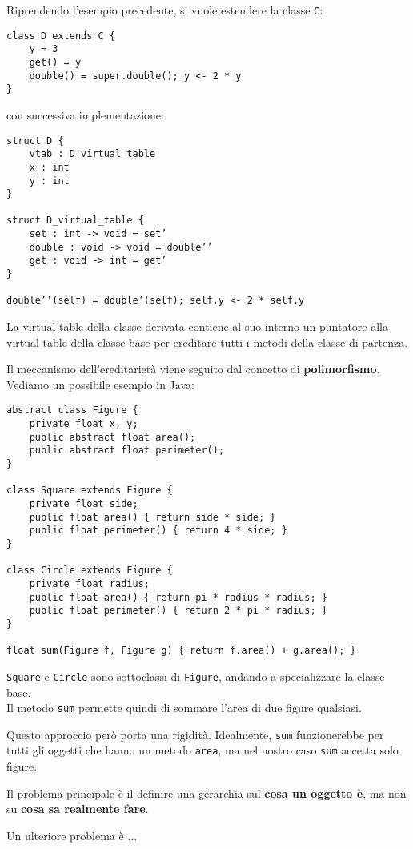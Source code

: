 \documentclass{article}
\begin{document}
Riprendendo l'esempio precedente, si vuole estendere la classe \texttt{C}:
\begin{tcolorbox}
\begin{verbatim}
class D extends C {
    y = 3
    get() = y
    double() = super.double(); y <- 2 * y
}
\end{verbatim}
\end{tcolorbox}
con successiva implementazione:
\begin{tcolorbox}
\begin{verbatim}
struct D {
    vtab : D_virtual_table
    x : int
    y : int
}

struct D_virtual_table {
    set : int -> void = set’
    double : void -> void = double’’
    get : void -> int = get’
}

double’’(self) = double’(self); self.y <- 2 * self.y
\end{verbatim}
\end{tcolorbox}
La virtual table della classe derivata contiene al suo interno un puntatore alla virtual table della classe base per ereditare tutti i metodi della classe di partenza.

\pagebreak

Il meccanismo dell'ereditarietà viene seguito dal concetto di \textbf{polimorfismo}. Vediamo un possibile esempio in Java:
\begin{tcolorbox}
\begin{verbatim}
abstract class Figure {
    private float x, y;
    public abstract float area();
    public abstract float perimeter();
}

class Square extends Figure {
    private float side;
    public float area() { return side * side; }
    public float perimeter() { return 4 * side; }
}

class Circle extends Figure {
    private float radius;
    public float area() { return pi * radius * radius; }
    public float perimeter() { return 2 * pi * radius; }
}

float sum(Figure f, Figure g) { return f.area() + g.area(); }
\end{verbatim}
\end{tcolorbox}
\texttt{Square} e \texttt{Circle} sono sottoclassi di \texttt{Figure}, andando a specializzare la classe base.\\
Il metodo \texttt{sum} permette quindi di sommare l'area di due figure qualsiasi.

Questo approccio però porta una rigidità. Idealmente, \texttt{sum} funzionerebbe per tutti gli oggetti che hanno un metodo \texttt{area}, ma nel nostro caso \texttt{sum} accetta solo figure.

Il problema principale è il definire una gerarchia sul \textbf{cosa un oggetto è}, ma non su \textbf{cosa sa realmente fare}.

Un ulteriore problema è ...
\end{document}
